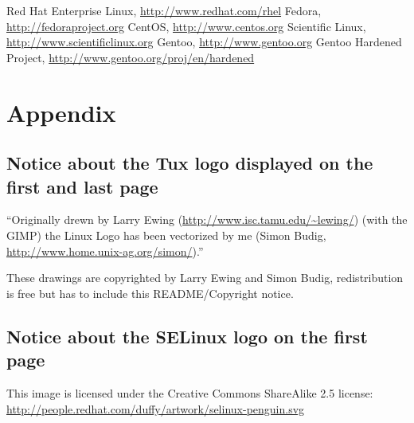 \documentclass[pdftex,a4paper,titlepage,11pt]{article}
\newcommand{\lastPage}{
	\newpage
	\strut
	\fancyhf{}
	\renewcommand{\headrulewidth}{0pt}
	\addtocounter{page}{-1}
	\AddToShipoutPicture*{\BackgroundPic{Tux_n&b_half_1.png}}
	\newpage
}
\newcommand\BackgroundPic[1]{
	\put(0,-100){
		\parbox[b][\paperheight]{\paperwidth}{
			\vfill
			\centering
			\texttt{[image: \#1]}
			\vfill
		}
	}
}
\begin{document}
\begin{thebibliography}{40}
 Red Hat Enterprise Linux, \url{http://www.redhat.com/rhel}
 Fedora, \url{http://fedoraproject.org}
 CentOS, \url{http://www.centos.org}
 Scientific Linux, \url{http://www.scientificlinux.org}
 Gentoo, \url{http://www.gentoo.org}
 Gentoo Hardened Project,
\url{http://www.gentoo.org/proj/en/hardened}

\end{thebibliography}

\newpage





\printnomenclature[3cm]

\newpage

\section*{Appendix} 

\subsection*{Notice about the Tux logo displayed on the first and last page}
``Originally drewn by Larry Ewing (\url{http://www.isc.tamu.edu/~lewing/}) (with
the GIMP) the Linux Logo has been vectorized by me (Simon Budig,
\url{http://www.home.unix-ag.org/simon/}).''

\bigskip

These drawings are copyrighted by Larry Ewing and Simon Budig, redistribution is
free but has to include this README/Copyright notice.

\subsection*{Notice about the SELinux logo on the first page}
This image is licensed under the Creative Commons ShareAlike 2.5 license:
\url{http://people.redhat.com/duffy/artwork/selinux-penguin.svg}

\lastPage
\end{document}
